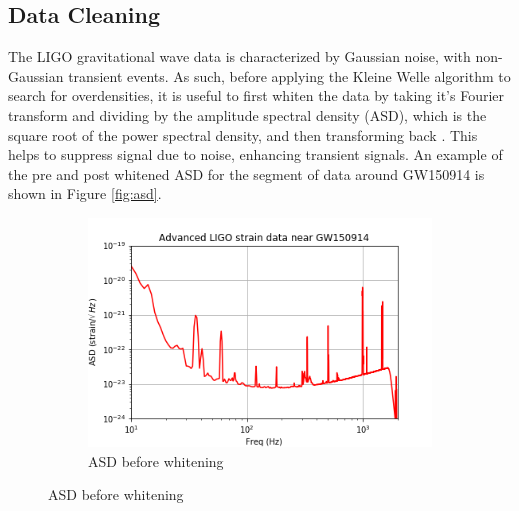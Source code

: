 \documentclass{article}
\begin{document}
\subsection{Data Cleaning}
The LIGO gravitational wave data is characterized by Gaussian noise, with non-Gaussian transient events. As such, before applying the Kleine Welle algorithm to search for overdensities, it is useful to first whiten the data by taking it's Fourier transform and dividing by the amplitude spectral density (ASD), which is the square root of the power spectral density, and then transforming back \cite{LIGOScientificCollaboration}. This helps to suppress signal due to noise, enhancing transient signals. An example of the pre and post whitened ASD for the segment of data around GW150914 is shown in Figure \ref{fig:asd}.

\begin{figure}
\begin{subfigure}{\textwidth}
\includegraphics[width=\textwidth]{GW150914_prewhite.png}
\caption{ASD before whitening}
\label{fig:prewhite}
\end{subfigure}


\end{figure}
\end{document}
